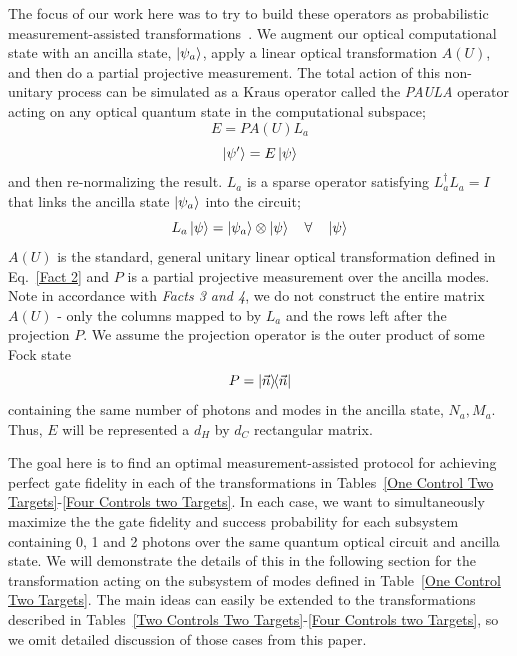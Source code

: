 \documentclass[aps,pra,twocolumn,showpacs,superscriptaddress,floatfix,10pt]{revtex4}
\begin{document}
The focus of our work here was to try to build these operators as probabilistic measurement-assisted transformations~\cite{KLM,Uskov}. We augment our optical computational state with an ancilla state, $\ket{\psi_a}$, apply a linear optical transformation $A(U)$, and then do a partial projective measurement. The total action of this non-unitary process can be simulated as a Kraus operator called the \textit{PAULA} operator acting on any optical quantum state in the computational subspace;
\begin{equation}
\label{Kraus Paula Operator}
E = P A(U) L_a
\end{equation} 
\begin{equation}
\ket{\psi^\prime} = E \ket{\psi}
\end{equation}
and then re-normalizing the result.  $L_a$ is a sparse operator satisfying $L_a^\dagger L_a = I$ that links the ancilla state $\ket{\psi_a}$ into the circuit;
\begin{equation}
\label{Ancilla Linker}
L_a \ket{\psi} = \ket{\psi_a} \otimes \ket{\psi} \quad  \forall \quad \ket{\psi}
\end{equation}
$A(U)$ is the standard, general unitary linear optical transformation defined in Eq.~\ref{Fact 2} and $P$ is a partial projective measurement over the ancilla modes. Note in accordance with \textit{Facts 3 and 4}, we do not construct the entire matrix $A(U)$ - only the columns mapped to by $L_a$ and the rows left after the projection $P$. We assume the projection operator is the outer product of some Fock state
\begin{equation}
P = \outerproduct{\vec{n}}{\vec{n}}
\end{equation}
containing the same number of photons and modes in the ancilla state, $N_a,M_a$. Thus, $E$ will be represented a $d_H$ by $d_C$ rectangular matrix. 

The goal here is to find an optimal measurement-assisted protocol for achieving perfect gate fidelity in each of the transformations in Tables~\ref{One Control Two Targets}-\ref{Four Controls two Targets}. In each case, we want to simultaneously maximize the the gate fidelity and success probability for each subsystem containing 0, 1 and 2 photons over the same quantum optical circuit and ancilla state. We will demonstrate the details of this in the following section for the transformation acting on the subsystem of modes defined in Table~\ref{One Control Two Targets}. The main ideas can easily be extended to the transformations described in Tables~\ref{Two Controls Two Targets}-\ref{Four Controls two Targets}, so we omit detailed discussion of those cases from this paper.
\end{document}

